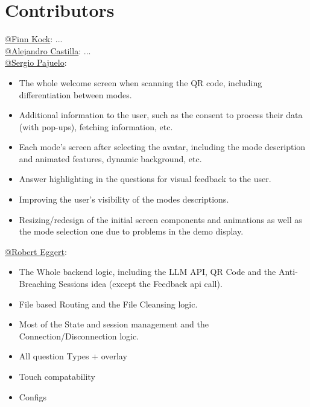 \section{Contributors}

\href{https://github.com/finnkock}{@Finn Kock}: ... \\
\href{https://github.com/alecasbar}{@Alejandro Castilla}: ...\\

\href{https://github.com/sergioPajuelo}{@Sergio Pajuelo}:
\begin{itemize}
    \item The whole welcome screen when scanning the QR code, including differentiation between modes.
    \item Additional information to the user, such as the consent to process their data (with pop-ups), fetching information, etc.
    \item Each mode's screen after selecting the avatar, including the mode description and animated features, dynamic background, etc.
    \item Answer highlighting in the questions for visual feedback to the user.
    \item Improving the user's visibility of the modes descriptions.
    \item Resizing/redesign of the initial screen components and animations as well as the mode selection one due to problems in the demo display.
\end{itemize}


\href{https://github.com/RobertEggert}{@Robert Eggert}: 
\begin{itemize}
    \item The Whole backend logic, including the LLM API, QR Code and the Anti-Breaching Sessions idea (except the Feedback api call).
    \item File based Routing and the File Cleansing logic.
    \item Most of the State and session management and the Connection/Disconnection logic.
    \item All question Types + overlay
    \item Touch compatability
    \item Configs
\end{itemize}